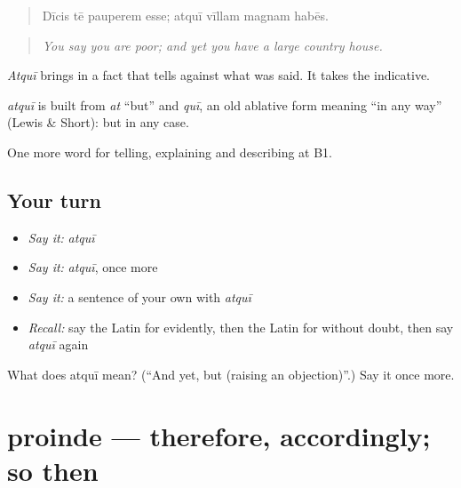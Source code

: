 \begin{quote}
Dīcis tē pauperem esse; atquī vīllam magnam habēs.
\end{quote}

\begin{quote}
\emph{You say you are poor; and yet you have a large country house.}
\end{quote}

\emph{Atquī} brings in a fact that tells against what was said. It takes the indicative.

\begin{cousinweb}
\emph{atquī} is built from \emph{at} \textquotedblleft{}but\textquotedblright{} and \emph{quī}, an old ablative form meaning \textquotedblleft{}in any way\textquotedblright{} (Lewis \& Short): but in any case.
\end{cousinweb}

\begin{grammarlens}[title={What you've built}]
One more word for telling, explaining and describing at B1.
\end{grammarlens}

\subsection*{Your turn}
\begin{itemize}
\raggedright
  \item \emph{Say it:} \emph{atquī}
  \item \emph{Say it:} \emph{atquī}, once more
  \item \emph{Say it:} a sentence of your own with \emph{atquī}
  \item \emph{Recall:} say the Latin for evidently, then the Latin for without doubt, then say \emph{atquī} again
\end{itemize}

\begin{tcolorbox}[breakable,colback=teal!4,colframe=teal!35!black,title={Before you move on}]
What does atquī mean? (\textquotedblleft{}And yet, but (raising an objection)\textquotedblright{}.) Say it once more.
\end{tcolorbox}
\section[proinde]{proinde — therefore, accordingly; so then}

\label{lesson:LA-C366-proinde}



